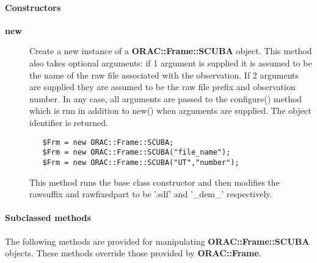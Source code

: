 \paragraph*{Constructors\label{ORAC::Frame::SCUBA_Constructors}}
\begin{description}

\item[{\textbf{new}}] \mbox{}

Create a new instance of a \textbf{ORAC::Frame::SCUBA} object.
This method also takes optional arguments:
if 1 argument is  supplied it is assumed to be the name
of the raw file associated with the observation. If 2 arguments
are supplied they are assumed to be the raw file prefix and
observation number. In any case, all arguments are passed to
the configure() method which is run in addition to new()
when arguments are supplied.
The object identifier is returned.

\begin{verbatim}
   $Frm = new ORAC::Frame::SCUBA;
   $Frm = new ORAC::Frame::SCUBA("file_name");
   $Frm = new ORAC::Frame::SCUBA("UT","number");
\end{verbatim}


This method runs the base class constructor and then modifies
the rawsuffix and rawfixedpart to be '.sdf' and '\_dem\_'
respectively.

\end{description}
\paragraph*{Subclassed methods\label{ORAC::Frame::SCUBA_Subclassed_methods}}


The following methods are provided for manipulating
\textbf{ORAC::Frame::SCUBA} objects. These methods override those
provided by \textbf{ORAC::Frame}.


